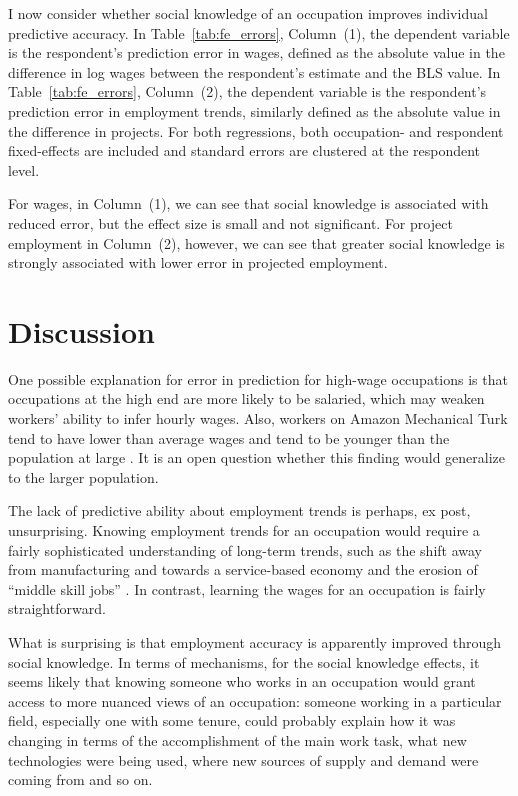 \documentclass[12pt]{article}
\begin{document}
I now consider whether social knowledge of an occupation improves individual predictive accuracy. 
In Table~\ref{tab:fe_errors}, Column~(1), the dependent variable is the respondent's prediction error in wages, defined as the absolute value in the difference in log wages between the respondent's estimate and the BLS value.  
In Table~\ref{tab:fe_errors}, Column~(2), the dependent variable is the respondent's prediction error in employment trends, similarly defined as the absolute value in the difference in projects. 
For both regressions, both occupation- and respondent fixed-effects are included and standard errors are clustered at the respondent level.  



For wages, in Column~(1), we can see that social knowledge is associated with reduced error, but the effect size is small and not significant. 
For project employment in Column~(2), however, we can see that greater social knowledge is strongly associated with lower error in projected employment.  

\section{Discussion}

One possible explanation for error in prediction for high-wage occupations is that occupations at the high end are more likely to be salaried, which may weaken workers' ability to infer hourly wages. 
Also, workers on Amazon Mechanical Turk tend to have lower than average wages and tend to be younger than the population at large \citep{ipeirotis2010demographics}. 
It is an open question whether this finding would generalize to the larger population. 

The lack of predictive ability about employment trends is perhaps, ex post, unsurprising. 
Knowing employment trends for an occupation would require a fairly sophisticated understanding of long-term trends, such as the shift away from manufacturing and towards a service-based economy and the erosion of ``middle skill jobs'' \citep{autor1998computing}.  
In contrast, learning the wages for an occupation is fairly straightforward. 

What is surprising is that employment accuracy is apparently improved through social knowledge. 
In terms of mechanisms, for the social knowledge effects, it seems likely that knowing someone who works in an occupation would grant access to more nuanced views of an occupation:
someone working in a particular field, especially one with some tenure, could probably explain how it was changing in terms of the accomplishment of the main work task, what new technologies were being used, where new sources of supply and demand were coming from and so on.  
\end{document}
